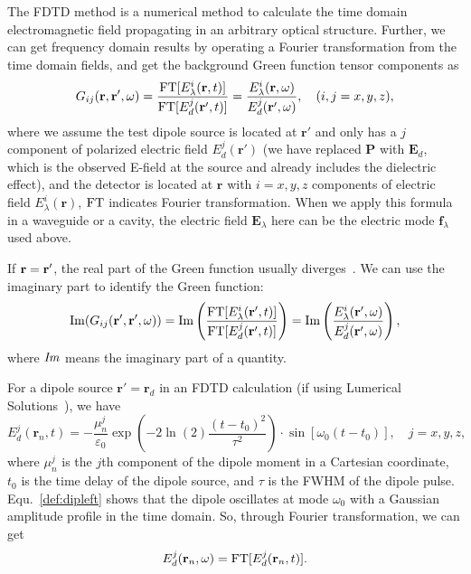 The FDTD method is a numerical method to calculate the time domain electromagnetic field propagating in an arbitrary optical structure.
Further, we can get frequency domain results by operating a Fourier transformation from the time domain fields,
and get the background Green function tensor components as
\begin{equation}
 \label{def:GFT}
 G_{ij}(\mathbf{r},\mathbf{r}',\omega)=\frac{{\rm FT}[E^i_\lambda(\mathbf{r},t)]}{{\rm FT}[E^j_d(\mathbf{r}',t)]}
=\frac{E^i_\lambda(\mathbf{r},\omega)}{E^j_d(\mathbf{r}',\omega)}, \quad (i,j=x, y, z),
\end{equation}
where we assume the test dipole source is located at $\mathbf{r}'$ and only has a $j$ component of polarized electric field $E^j_d(\mathbf{r}')$
(we have replaced $ \mathbf{P}$ with $\mathbf{E}_d$, which is the observed E-field at the source and already includes the dielectric effect),
and the detector is located at $\mathbf{r}$ with $i=x, y, z$ components of electric field $E^i_\lambda(\mathbf{r})$, ${\rm FT}$ indicates Fourier transformation.
When we apply this formula in a waveguide or a cavity, the electric field $\mathbf{E}_\lambda$ here
can be the electric mode $\mathbf{f}_\lambda$ used above.

If $\mathbf{r}=\mathbf{r}'$, the real part of the Green function usually diverges~\cite{Dung2003}. We can use the imaginary part to identify the Green function:
\begin{equation}
 \label{GFTimag}
 {\rm Im}(G_{ij}(\mathbf{r}',\mathbf{r}',\omega))={\rm Im}\left(\frac{{\rm FT}[E^i_\lambda(\mathbf{r}',t)]}{{\rm FT}[E^j_d(\mathbf{r}',t)]}\right)
={\rm Im}\left(\frac{E^i_\lambda(\mathbf{r}',\omega)}{E^j_d(\mathbf{r}',\omega)}\right),
\end{equation}
where ${\it Im}$ means the imaginary part of a quantity.



For a dipole source $\mathbf{r}'=\mathbf{r}_d$ in an FDTD calculation (if using Lumerical Solutions~\cite{LumericalSolutions}), we have
\begin{equation}
 \label{def:dipleft}
E^j_d(\mathbf{r}_n,t)=-\frac{\mu_n^j}{\varepsilon_0}\exp(-2\ln(2)\frac{(t-t_0)^2}{\tau^2})\cdot\sin[\omega_0(t-t_0)],\quad j=x, y, z,
\end{equation}
where $\mu_n^j$ is the $j$th component of the dipole moment in a Cartesian coordinate, $t_0$ is the time delay of the dipole source,
and $\tau$ is the FWHM of the dipole pulse. Equ.~\eqref{def:dipleft} shows that the dipole oscillates at mode $\omega_0$ with a Gaussian amplitude profile in the time domain. So, through Fourier transformation, we can get
\begin{equation}
 \label{dipolefw}
E^j_d(\mathbf{r}_n,\omega)={\rm FT}[E^j_d(\mathbf{r}_n,t)].
\end{equation}


